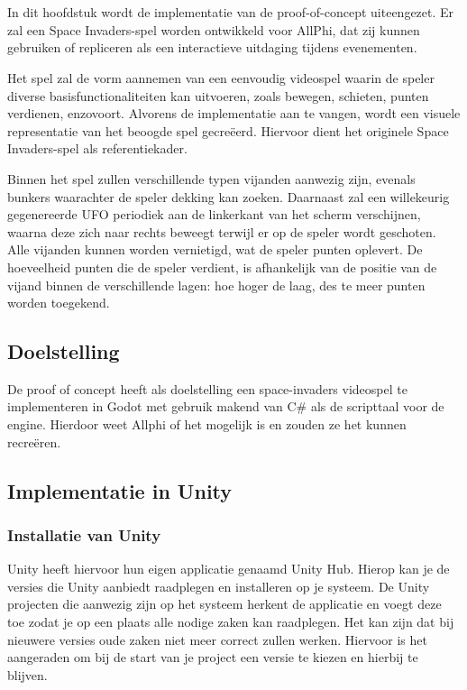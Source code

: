 
\chapter{}%
\label{ch:proof-of-concept}

In dit hoofdstuk wordt de implementatie van de proof-of-concept uiteengezet. Er zal een Space Invaders-spel worden ontwikkeld voor AllPhi, dat zij kunnen gebruiken of repliceren als een interactieve uitdaging tijdens evenementen. 

Het spel zal de vorm aannemen van een eenvoudig videospel waarin de speler diverse basisfunctionaliteiten kan uitvoeren, zoals bewegen, schieten, punten verdienen, enzovoort. Alvorens de implementatie aan te vangen, wordt een visuele representatie van het beoogde spel gecreëerd. Hiervoor dient het originele Space Invaders-spel als referentiekader.

Binnen het spel zullen verschillende typen vijanden aanwezig zijn, evenals bunkers waarachter de speler dekking kan zoeken. Daarnaast zal een willekeurig gegenereerde UFO periodiek aan de linkerkant van het scherm verschijnen, waarna deze zich naar rechts beweegt terwijl er op de speler wordt geschoten. Alle vijanden kunnen worden vernietigd, wat de speler punten oplevert. De hoeveelheid punten die de speler verdient, is afhankelijk van de positie van de vijand binnen de verschillende lagen: hoe hoger de laag, des te meer punten worden toegekend.

\section{Doelstelling}
De proof of concept heeft als doelstelling een space-invaders videospel te implementeren in Godot met gebruik makend van C\# als de scripttaal voor de engine. Hierdoor weet Allphi of het mogelijk is en zouden ze het kunnen recreëren.

\section{Implementatie in Unity}
\subsection{Installatie van Unity}
Unity heeft hiervoor hun eigen applicatie genaamd Unity Hub. Hierop kan je de versies die Unity aanbiedt raadplegen en installeren op je systeem. De Unity projecten die aanwezig zijn op het systeem herkent de applicatie en voegt deze toe zodat je op een plaats alle nodige zaken kan raadplegen. Het kan zijn dat bij nieuwere versies oude zaken niet meer correct zullen werken. Hiervoor is het aangeraden om bij de start van je project een versie te kiezen en hierbij te blijven.

